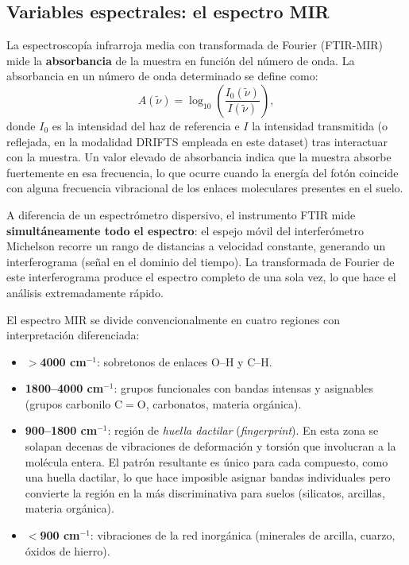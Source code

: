 \documentclass[12pt, a4paper]{article}
\begin{document}
\subsection{Variables espectrales: el espectro MIR}

La espectroscopía infrarroja media con transformada de Fourier (FTIR-MIR) mide la
\textbf{absorbancia} de la muestra en función del número de onda. La absorbancia en un
número de onda determinado se define como:
%
\begin{equation}
  A(\tilde{\nu}) = \log_{10}\!\left(\frac{I_0(\tilde{\nu})}{I(\tilde{\nu})}\right),
\end{equation}
%
donde $I_0$ es la intensidad del haz de referencia e $I$ la intensidad transmitida (o
reflejada, en la modalidad DRIFTS empleada en este dataset) tras interactuar con la
muestra. Un valor elevado de absorbancia indica que la muestra absorbe fuertemente en esa
frecuencia, lo que ocurre cuando la energía del fotón coincide con alguna frecuencia
vibracional de los enlaces moleculares presentes en el suelo.

A diferencia de un espectrómetro dispersivo, el instrumento FTIR mide
\textbf{simultáneamente todo el espectro}: el espejo móvil del interferómetro Michelson
recorre un rango de distancias a velocidad constante, generando un interferograma (señal
en el dominio del tiempo). La transformada de Fourier de este interferograma produce el
espectro completo de una sola vez, lo que hace el análisis extremadamente rápido.

El espectro MIR se divide convencionalmente en cuatro regiones con interpretación
diferenciada:

\begin{itemize}
  \item \textbf{$>$4000 cm$^{-1}$}: sobretonos de enlaces O--H y C--H.
  \item \textbf{1800--4000 cm$^{-1}$}: grupos funcionales con bandas intensas y
        asignables (grupos carbonilo C$=$O, carbonatos, materia orgánica).
  \item \textbf{900--1800 cm$^{-1}$}: región de \textit{huella dactilar}
        (\textit{fingerprint}). En esta zona se solapan decenas de vibraciones de
        deformación y torsión que involucran a la molécula entera. El patrón resultante
        es único para cada compuesto, como una huella dactilar, lo que hace imposible
        asignar bandas individuales pero convierte la región en la más discriminativa
        para suelos (silicatos, arcillas, materia orgánica).
  \item \textbf{$<$900 cm$^{-1}$}: vibraciones de la red inorgánica (minerales de arcilla,
        cuarzo, óxidos de hierro).
\end{itemize}
\end{document}
